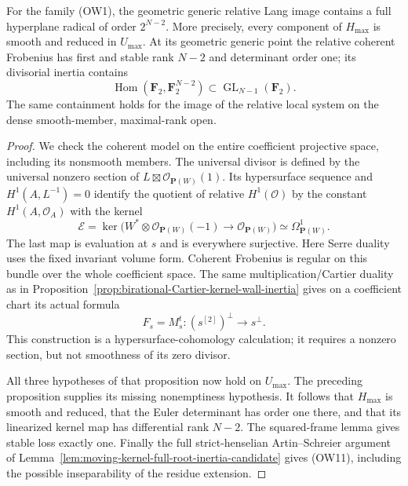 \begin{theorem}
\label{thm:odd-cover-full-hyperplane-inertia}
For the family (OW1), the geometric generic relative Lang image
contains a full hyperplane radical of order \(2^{N-2}\).
More precisely, every component of \(H_{\max}\) is smooth and
reduced in \(U_{\max}\).  At its geometric generic point the
relative coherent Frobenius has first and stable rank \(N-2\)
and determinant order one; its divisorial inertia contains
\[
 \operatorname{Hom}(\mathbf F_2,\mathbf F_2^{N-2})
 \subset\operatorname{GL}_{N-1}(\mathbf F_2).
 \tag{OW11}
\]
The same containment holds for the image of the relative local system
on the dense smooth-member, maximal-rank open.
\end{theorem}
\begin{proof}
We check the coherent model on the entire coefficient projective
space, including its nonsmooth members.  The universal divisor is
defined by the universal nonzero section of
\(L\boxtimes\mathcal O_{\mathbf P(W)}(1)\).  Its hypersurface
sequence and \(H^1(A,L^{-1})=0\) identify the quotient of relative
\(H^1(\mathcal O)\) by the constant \(H^1(A,\mathcal O_A)\) with
the kernel
\[
 \mathcal E=
 \ker\bigl(W^*\otimes\mathcal O_{\mathbf P(W)}(-1)
                      \longrightarrow\mathcal O_{\mathbf P(W)}\bigr)
 \simeq\Omega^1_{\mathbf P(W)}.
 \tag{OW12}
\]
The last map is evaluation at \(s\) and is everywhere surjective.
Here Serre duality uses the fixed invariant volume form.  Coherent
Frobenius is regular on this bundle over the whole coefficient space.
The same multiplication/Cartier duality as in
Proposition~\ref{prop:birational-Cartier-kernel-wall-inertia}
gives on a coefficient chart its actual formula
\[
 F_s=M_s^t:(s^{[2]})^\perp\longrightarrow s^\perp.
 \tag{OW13}
\]
This construction is a hypersurface-cohomology calculation; it
requires a nonzero section, but not smoothness of its zero divisor.

All three hypotheses of that proposition now hold on \(U_{\max}\).
The preceding proposition supplies its missing nonemptiness
hypothesis.  It follows that \(H_{\max}\) is smooth and reduced,
that the Euler determinant has order one there, and that its
linearized kernel map has differential rank \(N-2\).  The squared-frame
lemma gives stable loss exactly one.  Finally the full
strict-henselian Artin--Schreier argument of
Lemma~\ref{lem:moving-kernel-full-root-inertia-candidate} gives
(OW11), including the possible inseparability of the residue extension.


\end{proof}

